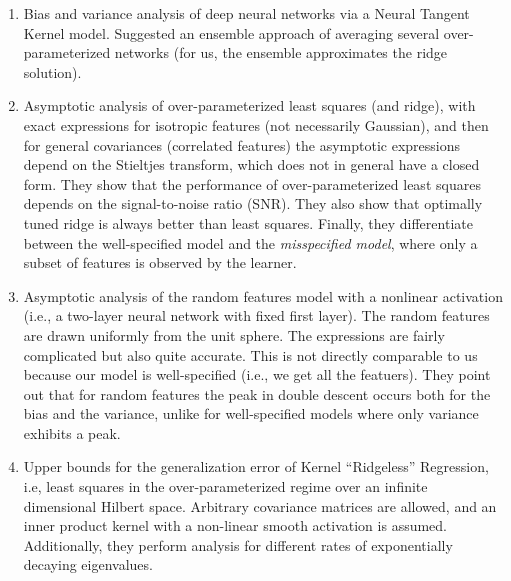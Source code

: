 \documentclass[12pt]{sty/colt2019/colt2018-arxiv}
\begin{document}
\begin{enumerate}
 \item \citet*{GJSx19_TR} Bias and variance analysis of deep neural
   networks via a Neural Tangent Kernel model. Suggested an ensemble
   approach of averaging  several over-parameterized networks (for us,
   the ensemble approximates the ridge solution).

 \item \citet*{HMRT19_TR} Asymptotic analysis of over-parameterized
   least squares (and ridge), with exact expressions for isotropic
   features (not necessarily Gaussian), and then for general
   covariances (correlated features) the asymptotic expressions depend on the Stieltjes
   transform, which does not in general have a closed form. They show
   that the performance of over-parameterized least squares depends on
   the signal-to-noise ratio (SNR). They also show that optimally
   tuned ridge is always better than least squares. Finally, they
   differentiate between the well-specified model and the
   \emph{misspecified model}, where only a subset of features is
   observed by the learner.

 \item \citet*{MM19_TR} Asymptotic analysis of the random features
   model with a nonlinear activation (i.e., a two-layer neural network
   with fixed first layer). The random features are drawn uniformly
   from the unit sphere. The expressions are fairly complicated but
   also quite accurate. This is not directly comparable to us because
   our model is well-specified (i.e., we get all the featuers). They
   point out that for random features the peak in double descent
   occurs both for the bias and the variance, unlike for
   well-specified models where only variance exhibits a peak.

 \item \citet*{LR18_TR}   Upper bounds for the generalization error of
   Kernel ``Ridgeless''   Regression, i.e, least squares in the
   over-parameterized regime over an infinite dimensional Hilbert
   space. Arbitrary covariance matrices are allowed, and an inner
   product kernel with a non-linear smooth activation is
   assumed. Additionally, they
   perform analysis for different rates of exponentially decaying eigenvalues. 
\end{enumerate}

\appendix
\end{document}
